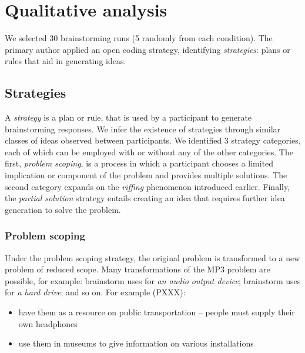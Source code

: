 \section{Qualitative analysis}


We selected 30 brainstorming runs (5 randomly from each condition). The primary author applied an open coding strategy, identifying \emph{strategies}: plans or rules that aid in generating ideas. %

\subsection{Strategies}

A \emph{strategy} is a plan or rule, that is used by a participant to generate brainstorming responses. We infer the existence of strategies through similar classes of ideas observed between participants.
We identified 3 strategy categories, each of which can be employed with or without any of the other categories.
The first, \emph{problem scoping}, is a process in which a participant chooses a limited implication or component of the problem and provides multiple solutions.
The second category expands on the \emph{riffing} phenomenon introduced earlier.
Finally, the \emph{partial solution} strategy entails creating an idea that requires further idea generation to solve the problem.

\subsubsection{Problem scoping}

Under the problem scoping strategy, the original problem is transformed to a new problem of reduced scope.
Many transformations of the MP3 problem are possible, for example: brainstorm uses for \emph{an audio output device}; brainstorm uses for \emph{a hard drive}; and so on. For example (PXXX):

\begin{itemize}
    \item have them as a resource on public transportation -- people must supply their own headphones
    \item use them in museums to give information on various installations
\end{itemize}


